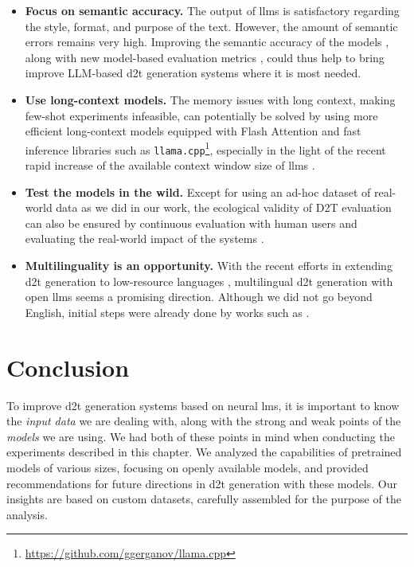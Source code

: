 \begin{itemize}
    \item \textbf{Focus on semantic accuracy.} The output of \acp{llm} is satisfactory regarding the style, format, and purpose of the text. However, the amount of semantic errors remains very high. Improving the semantic accuracy of the models
          \cite{li2022faithfulness}, along with new model-based evaluation metrics \cite{liuGEvalNLGEvaluation2023,xuINSTRUCTSCOREExplainableText2023}, could thus help to bring improve LLM-based \ac{d2t} generation systems where it is most needed.
          \item\textbf{Use long-context models.} The memory issues with long context, making few-shot experiments infeasible, can potentially be solved by using more efficient long-context models equipped with Flash Attention \cite{dao2022flashattention} and fast inference libraries such as \texttt{llama.cpp}\footnote{\url{https://github.com/ggerganov/llama.cpp}}, especially in the light of the recent rapid increase of the available context window size of \acp{llm} \cite{bai2023longbench,munkhdalai2024leave}.
          \item\textbf{Test the models in the wild.} Except for using an ad-hoc dataset of real-world data as we did in our work, the ecological validity of D2T evaluation can also be ensured by continuous evaluation with human users \cite{zheng2023judging} and evaluating the real-world impact of the systems \cite{reiter2023impact}.
          \item\textbf{Multilinguality is an opportunity.} With the recent efforts in extending \ac{d2t} generation to low-resource languages \cite{cripwell2023WebNLGShared2023}, multilingual \ac{d2t} generation with open \acp{llm} seems a promising direction. Although we did not go beyond English, initial steps were already done by works such as \citet{lorandi2023data}.
\end{itemize}

\section{Conclusion}
To improve \ac{d2t} generation systems based on neural \acp{lm}, it is important to know the \emph{input data} we are dealing with, along with the strong and weak points of the \emph{models} we are using. We had both of these points in mind when conducting the experiments described in this chapter. We analyzed the capabilities of pretrained models of various sizes, focusing on openly available models, and provided recommendations for future directions in \ac{d2t} generation with these models. Our insights are based on custom datasets, carefully assembled for the purpose of the analysis.

